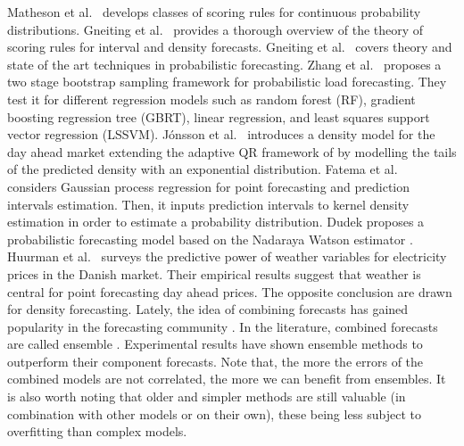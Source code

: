 Matheson et al.\ \cite{matheson1976scoring} develops classes of scoring rules for continuous probability distributions.
Gneiting et al.\ \cite{gneiting2007strictly}
provides a thorough overview of the theory of scoring rules for interval and density forecasts.
Gneiting et al.\ \cite{gneiting2014probabilistic}
covers theory and state of the art techniques in probabilistic forecasting.
Zhang et al.\ \cite{zhang2020two} proposes a two stage bootstrap sampling framework for probabilistic load forecasting. They test it for different regression models such as random forest (RF), gradient boosting regression tree (GBRT), linear regression, and least squares support vector regression (LSSVM).
Jónsson et al.\ \cite{jonsson2014predictive}
introduces a density model for the day ahead market extending the adaptive QR framework of \cite{moller2008time} by modelling the tails of the predicted density with an exponential distribution.
Fatema et al.\ \cite{fatema2023probabilistic} considers Gaussian process regression for point forecasting and prediction intervals estimation. Then, it inputs prediction intervals to kernel density estimation in order to estimate a probability distribution.
Dudek \cite{dudek2018probabilistic} proposes a probabilistic forecasting model based on the Nadaraya Watson estimator \cite{nadaraya1964estimating,watson1964smooth}.
Huurman et al.\ \cite{huurman2012power} surveys the predictive power of weather variables for electricity prices in the Danish market. Their empirical results suggest that weather is central for point forecasting day ahead prices. The opposite conclusion are drawn for density forecasting.
Lately, the idea of combining forecasts has gained popularity in the forecasting community \cite{forecasting_big}. In the literature, combined forecasts are called ensemble \cite{gneiting_weather_ensemble}.
Experimental results have shown ensemble methods to outperform their component forecasts.
Note that, the more the errors of the combined models are not correlated, the more we can benefit from ensembles.
It is also worth noting that older and simpler methods are still valuable (in combination with other models or on their own), these being less subject to overfitting than complex models.

